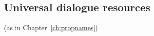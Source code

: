   





  


  



 



\subsection{Universal dialogue resources} (as in Chapter~\ref{ch:propnames})

